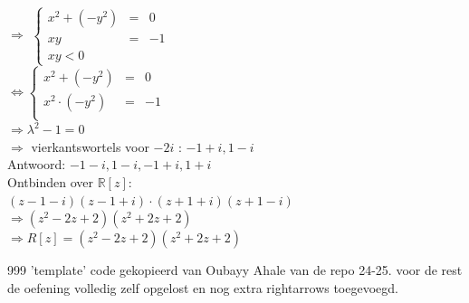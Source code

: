 \documentclass[a4paper]{article}
\begin{document}
$\Rightarrow$ $\left\{
    \begin{array}{lll} 
        x^2 + (-y^2) &=& 0 \\
        xy &=& -1 \\
        xy < 0
    \end{array}
\right .$\\

$\Leftrightarrow \left\{
    \begin{array}{lll} 
        x^2 + (-y^2) &=& 0 \\
        x^2 \cdot (-y^2) &=& -1 \\
    \end{array}
\right .$\\

$\Rightarrow \lambda^2 -1 = 0 $ \\

$\Rightarrow $ vierkantswortels voor $-2i$ : ${-1+i,1-i}$\\

Antwoord: ${-1-i,1-i,-1+i,1+i}$\\

Ontbinden over $\mathbb{R}[z]$:\\

$(z-1-i)(z-1+i) \cdot (z+1+i)(z+1-i)$\\

$\Rightarrow (z^2 - 2z +2)(z^2 + 2z + 2)$\\

$\Rightarrow R[z] = (z^2 - 2z +2)(z^2 + 2z + 2)$




\begin{thebibliography}{999}
'template' code gekopieerd van Oubayy Ahale van de repo 24-25.
voor de rest de oefening volledig zelf opgelost en nog extra rightarrows toegevoegd.
\end{thebibliography}
\end{document}
